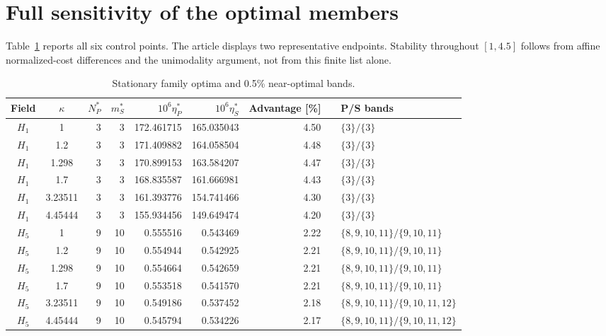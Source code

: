 \documentclass[11pt]{article}
\begin{document}
\section{Full sensitivity of the optimal members}
Table~\ref{tab:optima} reports all six control points. The article displays two representative endpoints. Stability throughout $[1,4.5]$ follows from affine normalized-cost differences and the unimodality argument, not from this finite list alone.
\begin{table}[htbp]\centering\scriptsize
\caption{Stationary family optima and 0.5\% near-optimal bands.}\label{tab:optima}
\setlength{\tabcolsep}{4pt}
\begin{tabular}{ccrrrrrrl}\toprule
Field & $\kappa$ & $N_P^*$ & $m_S^*$ & $10^6\eta_P^*$ & $10^6\eta_S^*$ & Advantage [\%] & & P/S bands\\\midrule
$H_1$ & 1 & 3 & 3 & 172.461715 & 165.035043 & 4.50 & & $\{3\}/\{3\}$\\
$H_1$ & 1.2 & 3 & 3 & 171.409882 & 164.058504 & 4.48 & & $\{3\}/\{3\}$\\
$H_1$ & 1.298 & 3 & 3 & 170.899153 & 163.584207 & 4.47 & & $\{3\}/\{3\}$\\
$H_1$ & 1.7 & 3 & 3 & 168.835587 & 161.666981 & 4.43 & & $\{3\}/\{3\}$\\
$H_1$ & 3.23511 & 3 & 3 & 161.393776 & 154.741466 & 4.30 & & $\{3\}/\{3\}$\\
$H_1$ & 4.45444 & 3 & 3 & 155.934456 & 149.649474 & 4.20 & & $\{3\}/\{3\}$\\
$H_5$ & 1 & 9 & 10 & 0.555516 & 0.543469 & 2.22 & & $\{8,9,10,11\}/\{9,10,11\}$\\
$H_5$ & 1.2 & 9 & 10 & 0.554944 & 0.542925 & 2.21 & & $\{8,9,10,11\}/\{9,10,11\}$\\
$H_5$ & 1.298 & 9 & 10 & 0.554664 & 0.542659 & 2.21 & & $\{8,9,10,11\}/\{9,10,11\}$\\
$H_5$ & 1.7 & 9 & 10 & 0.553518 & 0.541570 & 2.21 & & $\{8,9,10,11\}/\{9,10,11\}$\\
$H_5$ & 3.23511 & 9 & 10 & 0.549186 & 0.537452 & 2.18 & & $\{8,9,10,11\}/\{9,10,11,12\}$\\
$H_5$ & 4.45444 & 9 & 10 & 0.545794 & 0.534226 & 2.17 & & $\{8,9,10,11\}/\{9,10,11,12\}$\\
\bottomrule\end{tabular}\end{table}
\clearpage
\end{document}
